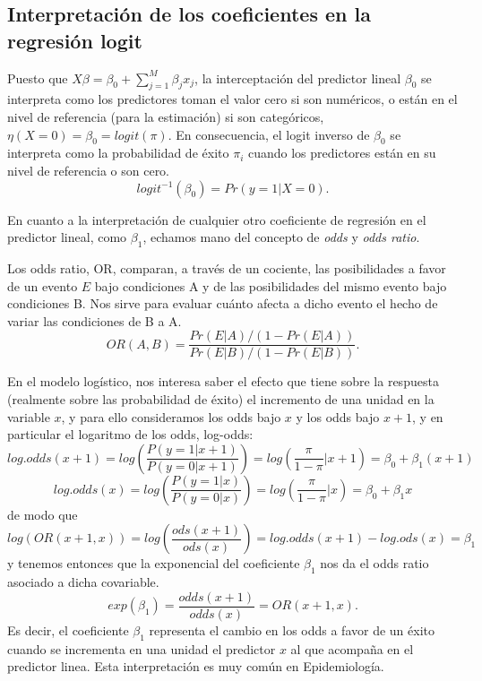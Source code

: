 \documentclass[
]{book}
\begin{document}
\hypertarget{interpretaciuxf3n-de-los-coeficientes-en-la-regresiuxf3n-logit}{%
\subsection*{Interpretación de los coeficientes en la regresión logit}\label{interpretaciuxf3n-de-los-coeficientes-en-la-regresiuxf3n-logit}}

Puesto que \(X\beta=\beta_0+\sum_{j=1}^M \beta_j x_{j}\), la interceptación del predictor lineal \(\beta_0\) se interpreta como los predictores toman el valor cero si son numéricos, o están en el nivel de referencia (para la estimación) si son categóricos, \(\eta(X=0)=\beta_0=logit(\pi)\). En consecuencia, el logit inverso de \(\beta_0\) se interpreta como la probabilidad de éxito \(\pi_i\) cuando los predictores están en su nivel de referencia o son cero.
\[logit^{-1}(\beta_0)=Pr(y=1|X=0).\]

En cuanto a la interpretación de cualquier otro coeficiente de regresión en el predictor lineal, como \(\beta_1\), echamos mano del concepto de \emph{odds} y \emph{odds ratio}.

Los odds ratio, OR, comparan, a través de un cociente, las posibilidades a favor de un evento \(E\) bajo condiciones A y de las posibilidades del mismo evento bajo condiciones B. Nos sirve para evaluar cuánto afecta a dicho evento el hecho de variar las condiciones de B a A.
\[OR(A,B)=\frac{Pr(E|A)/(1-Pr(E|A))}{Pr(E|B)/(1-Pr(E|B))}.\]

En el modelo logístico, nos interesa saber el efecto que tiene sobre la respuesta (realmente sobre las probabilidad de éxito) el incremento de una unidad en la variable \(x\), y para ello consideramos los odds bajo \(x\) y los odds bajo \(x+1\), y en particular el logaritmo de los odds, log-odds:
\[log.odds(x+1)=log \left( \frac{P(y=1|x+1)}{P(y=0|x+1)} \right)=log \left(\frac{\pi}{1-\pi} | x+1\right)=\beta_0+\beta_1 (x+1)\]
\[log.odds(x)=log \left(\frac{P(y=1|x)}{P(y=0|x)} \right)=log \left(\frac{\pi}{1-\pi} | x\right)=\beta_0+\beta_1 x\]
de modo que
\[log(OR(x+1,x))=log \left(\frac{ods (x+1)}{ods(x)} \right) = log.odds(x+1)-log.ods(x)= \beta_1\]
y tenemos entonces que la exponencial del coeficiente \(\beta_1\) nos da el odds ratio asociado a dicha covariable.
\[exp(\beta_1)=\frac{odds(x+1)}{odds(x)}=OR(x+1,x).\]
Es decir, el coeficiente \(\beta_1\) representa el cambio en los odds a favor de un éxito cuando se incrementa en una unidad el predictor \(x\) al que acompaña en el predictor linea. Esta interpretación es muy común en Epidemiología.
\end{document}
